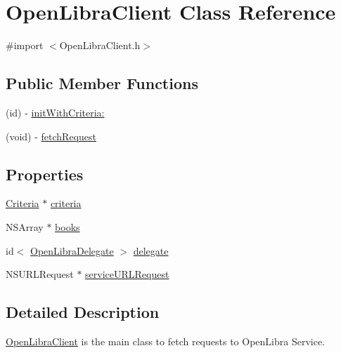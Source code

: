 \hypertarget{interface_open_libra_client}{
\section{OpenLibraClient Class Reference}
\label{interface_open_libra_client}
}


{\ttfamily \#import $<$OpenLibraClient.h$>$}

\subsection*{Public Member Functions}
\begin{DoxyCompactItemize}
\item 
(id) -\/ \hyperlink{interface_open_libra_client_ad146dbb3fa49dc728f9b586d107801f7}{initWithCriteria:}
\item 
(void) -\/ \hyperlink{interface_open_libra_client_a4aa51fabaa299898e53c77ef33f5b1a6}{fetchRequest}
\end{DoxyCompactItemize}
\subsection*{Properties}
\begin{DoxyCompactItemize}
\item 
\hyperlink{interface_criteria}{Criteria} $\ast$ \hyperlink{interface_open_libra_client_afe8b3b6e59856c494c05b2967a0dffd2}{criteria}
\item 
NSArray $\ast$ \hyperlink{interface_open_libra_client_a56a391d011a068a6b4c1369a1860b198}{books}
\item 
id$<$ \hyperlink{protocol_open_libra_delegate-p}{OpenLibraDelegate} $>$ \hyperlink{interface_open_libra_client_a4d0bb75196cc3cdb9631372a3a09434f}{delegate}
\item 
NSURLRequest $\ast$ \hyperlink{interface_open_libra_client_ab1edd647861203cf4455c9a3711cdd41}{serviceURLRequest}
\end{DoxyCompactItemize}


\subsection{Detailed Description}
\hyperlink{interface_open_libra_client}{OpenLibraClient} is the main class to fetch requests to OpenLibra Service. 

